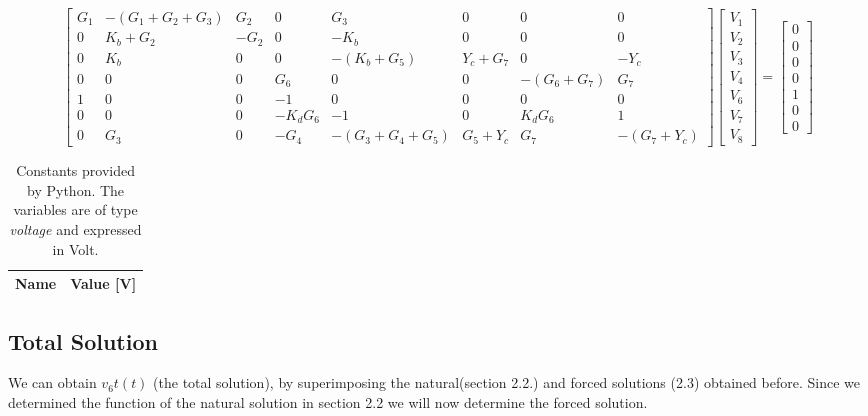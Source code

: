 \begin{equation*}
	\begin{bmatrix}
		G_1 & -(G_1 + G_2 + G_3) & G_2 & 0 & G_3 & 0 & 0 & 0 \\ 
		0 & K_b + G_2 & -G_2 & 0 & -K_b & 0 & 0 & 0 \\
		0 & K_b & 0 & 0 & -(K_b + G_5) & Y_c + G_7 & 0 & -Y_c \\ 
		0 & 0 & 0 & G_6 & 0 & 0 & -(G_6 + G_7) & G_7 \\
		1 & 0 & 0 & -1 & 0 & 0 & 0 & 0 \\
		0 & 0 & 0 & -K_dG_6 & -1 & 0 & K_dG_6 & 1 \\
		0 & G_3 & 0 & -G_4 & -(G_3 + G_4 + G_5) & G_5 + Y_c & G_7 & -(G_7 + Y_c)
	\end{bmatrix}
	\begin{bmatrix} V_1 \\ V_2 \\ V_3 \\ V_4 \\ V_6 \\ V_7 \\ V_8 
	\end{bmatrix}
	=
	\begin{bmatrix} 0 \\ 0 \\ 0 \\ 0 \\ 1 \\ 0 \\ 0 
	\end{bmatrix}
\end{equation*}


\begin{table}[H]
	\centering
	\begin{tabular}{|l|r|}
		\hline    
		{\bf Name} & {\bf Value [V]} \\ \hline
		
	\end{tabular}
	\caption{Constants provided by Python. The variables are of type {\it voltage} and expressed in
		Volt.}
	\label{tab:op5}
\end{table}

\subsection{Total Solution}
We can obtain $v_6t(t)$ (the total solution), by superimposing the natural(section 2.2.) and forced solutions (2.3) obtained before. Since we determined the function of the natural solution in section 2.2 we will now determine the forced solution.

